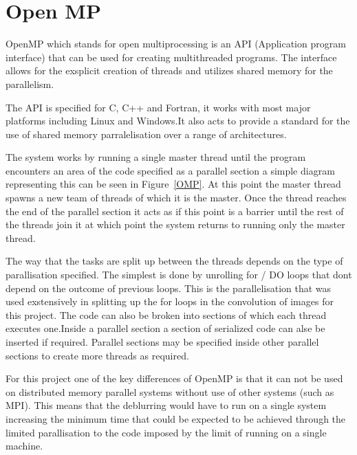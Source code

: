 \section{Open MP}

OpenMP which stands for open multiprocessing is an API (Application program interface) that can be used for creating multithreaded programs. The interface allows for the exsplicit creation of threads and utilizes shared memory for the parallelism.

The API is specified for C, C++ and Fortran, it works with most major platforms including Linux and Windows.It also acts to provide a standard for the use of shared memory parralelisation over a range of architectures.

The system works by running a single master thread until the program encounters an area of the code specified as a parallel section a simple diagram representing this can be seen in Figure~\ref{OMP}. At this point the master thread spawns a new team of threads of which it is the master. Once the thread reaches the end of the parallel section it acts as if this point is a barrier until the rest of the threads join it at which point the system returns to running only the master thread. 

The way that the tasks are split up between the threads depends on the type of parallisation specified. The simplest is done by unrolling for / DO loops that dont depend on the outcome of previous loops. This is the parallelisation that was used exstensively in splitting up the for loops in the convolution of images for this project. The code can also be broken into sections of which each thread executes one.Inside a parallel section a section of serialized code can alse be inserted if required. Parallel sections may be specified inside other parallel sections to create more threads as required.

For this project one of the key differences of OpenMP is that it can not be used on distributed memory parallel systems without use of other systems (such as MPI). This means that the deblurring would have to run on a single system increasing the minimum time that could be expected to be achieved through the limited parallisation to the code imposed by the limit of running on a single machine.